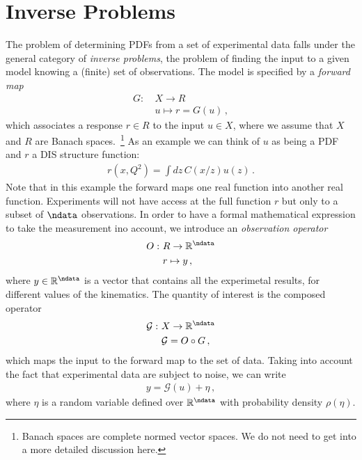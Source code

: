 
\section{Inverse Problems}
\label{sec:inverse-problems}

The problem of determining PDFs from a set of experimental data falls
under the general category of {\em inverse problems}, \ie the problem
of finding the input to a given model knowing a (finite) set of
observations. The model is specified by a {\em forward map}
\begin{align}
  \label{eq:ForwardMap}
  G : ~& X \to R \nonumber \\
      & u \mapsto r=G(u) \, ,
\end{align}
which associates a response $r \in R$ to the input $u \in X$, where we
assume that $X$ and $R$ are Banach spaces.~\footnote{Banach spaces are
  complete normed vector spaces. We do not need to get into a more
  detailed discussion here.} As an example we can think of $u$ as
being a PDF and $r$ a DIS structure function:
\begin{align}
  \label{eq:DISExample}
  r(x,Q^2) = \int dz\, C(x/z) u(z)\, .
\end{align}
Note that in this example the forward maps one real function into
another real function. Experiments will not have access at the full
function $r$ but only to a subset of $\ndata$ observations. In order
to have a formal mathematical expression to take the measurement ino
account, we introduce an {\em observation operator}
\begin{align}
  O : ~& R \to \mathbb{R}^{\ndata} \nonumber \\
       & r \mapsto y \, ,
\end{align}
where $y \in \mathbb{R}^{\ndata}$ is a vector that contains all the
experimetal results, \eg for different values of the kinematics. The
quantity of interest is the composed operator 
\begin{align}
  \mathcal{G} : ~& X \to \mathbb{R}^{\ndata} \nonumber \\
                 & \mathcal{G} = O \circ G\, ,
\end{align}
which maps the input to the forward map to the set of data. Taking
into account the fact that experimental data are subject to noise, we
can write
\begin{align}
  \label{eq:NoisyInverseProblem}
  y = \mathcal{G}(u) + \eta\, ,
\end{align}
where $\eta$ is a random variable defined over $\mathbb{R}^{\ndata}$
with probability density $\rho(\eta)$.

